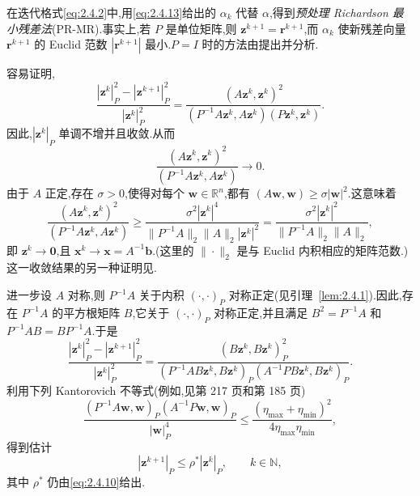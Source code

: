 在迭代格式\eqref{eq:2.4.2}中,用\eqref{eq:2.4.13}给出的 \(\alpha_k\) 代替 \(\alpha\),得到\emph{预处理 Richardson 最小残差法}(PR-MR).事实上,若 \(P\) 是单位矩阵,则 \(\boldsymbol{z}^{k+1}=\boldsymbol{r}^{k+1}\),而 \(\alpha_k\) 使新残差向量 \(\boldsymbol{r}^{k+1}\) 的 Euclid 范数 \(|\boldsymbol{r}^{k+1}|\) 最小.\(P=I\) 时的方法由提出并分析.

容易证明,
\[
  \frac{|\boldsymbol{z}^k|_P^2-|\boldsymbol{z}^{k+1}|_P^2}{|\boldsymbol{z}^k|_P^2}
  =\frac{(A\boldsymbol{z}^k,\boldsymbol{z}^k)^2}
         {(P^{-1}A\boldsymbol{z}^k,A\boldsymbol{z}^k)(P\boldsymbol{z}^k,\boldsymbol{z}^k)}.
\]
因此,\(|\boldsymbol{z}^k|_P\) 单调不增并且收敛.从而
\[
  \frac{(A\boldsymbol{z}^k,\boldsymbol{z}^k)^2}{(P^{-1}A\boldsymbol{z}^k,A\boldsymbol{z}^k)}
  \longrightarrow0.
\]
由于 \(A\) 正定,存在 \(\sigma>0\),使得对每个 \(\boldsymbol{w}\in\mathbb R^n\),都有 \((A\boldsymbol{w},\boldsymbol{w})\ge\sigma|\boldsymbol{w}|^2\).这意味着
\[
  \frac{(A\boldsymbol{z}^k,\boldsymbol{z}^k)^2}{(P^{-1}A\boldsymbol{z}^k,A\boldsymbol{z}^k)}
  \ge\frac{\sigma^2|\boldsymbol{z}^k|^4}{\|P^{-1}A\|_2\|A\|_2|\boldsymbol{z}^k|^2}
  =\frac{\sigma^2|\boldsymbol{z}^k|^2}{\|P^{-1}A\|_2\|A\|_2},
\]
即 \(\boldsymbol{z}^k\to\boldsymbol{0}\),且 \(\boldsymbol{x}^k\to\boldsymbol{x}=A^{-1}\boldsymbol{b}\).(这里的 \(\|\cdot\|_2\) 是与 Euclid 内积相应的矩阵范数.)这一收敛结果的另一种证明见.

进一步设 \(A\) 对称,则 \(P^{-1}A\) 关于内积 \((\cdot,\cdot)_P\) 对称正定(见引理~\ref{lem:2.4.1}).因此,存在 \(P^{-1}A\) 的平方根矩阵 \(B\),它关于 \((\cdot,\cdot)_P\) 对称正定,并且满足 \(B^2=P^{-1}A\) 和 \(P^{-1}AB=BP^{-1}A\).于是
\[
  \frac{|\boldsymbol{z}^k|_P^2-|\boldsymbol{z}^{k+1}|_P^2}{|\boldsymbol{z}^k|_P^2}
  =\frac{(B\boldsymbol{z}^k,B\boldsymbol{z}^k)_P^2}
   {(P^{-1}AB\boldsymbol{z}^k,B\boldsymbol{z}^k)_P(A^{-1}PB\boldsymbol{z}^k,B\boldsymbol{z}^k)_P}.
\]
利用下列 Kantorovich 不等式(例如,见第 217 页和第 185 页)
\[
  \frac{(P^{-1}A\boldsymbol{w},\boldsymbol{w})_P(A^{-1}P\boldsymbol{w},\boldsymbol{w})_P}{|\boldsymbol{w}|_P^4}
  \le\frac{(\eta_{\max}+\eta_{\min})^2}{4\eta_{\max}\eta_{\min}},
\]
得到估计
\begin{equation}\label{eq:2.4.14}
  |\boldsymbol{z}^{k+1}|_P\le\rho^*|\boldsymbol{z}^k|_P,\qquad k\in\mathbb N,
\end{equation}
其中 \(\rho^*\) 仍由\eqref{eq:2.4.10}给出.

